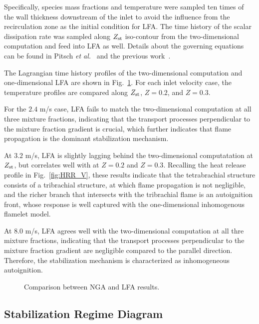 \documentclass{wssci}
\begin{document}
Specifically, species mass fractions and temperature were sampled ten times of the wall thickness downstream of the inlet to avoid the influence from the recirculation zone as the initial condition for LFA.  The time history of the scalar dissipation rate was sampled along $Z_{\rm st}$ iso-contour from the two-dimensional computation and feed into LFA as well.  Details about the governing equations can be found in Pitsch \emph{et al.}~\cite{pitsch98a} and the previous work~\cite{deng15}.

The Lagrangian time history profiles of the two-dimensional computation and one-dimensional LFA are shown in Fig.~\ref{fig:LFA_V}.  For each inlet velocity case, the temperature profiles are compared along $Z_{\rm st}$, $Z = 0.2$, and $Z = 0.3$.  

For the $2.4$ m/s case, LFA fails to match the two-dimensional computation at all three mixture fractions, indicating that the transport processes perpendicular to the mixture fraction gradient is crucial, which further indicates that flame propagation is the dominant stabilization mechanism.

At $3.2$ m/s, LFA is slightly lagging behind the two-dimensional computatation at $Z_{\rm st}$, but correlates well with at $Z = 0.2$ and $Z = 0.3$.  Recalling the heat release profile in Fig.~\ref{fig:HRR_V}, these results indicate that the tetrabrachial structure consists of a tribrachial structure, at which flame propagation is not negligible, and the richer branch that intersects with the tribrachial flame is an autoignition front, whose response is well captured with the one-dimensional inhomogenous flamelet model.  

At $8.0$ m/s, LFA agrees well with the two-dimensional computation at all thre mixture fractions, indicating that the transport processes perpendicular to the mixture fraction gradient are negligible compared to the parallel direction.  Therefore, the stabilization mechanism is characterized as inhomogeneous autoignition.

\begin{figure}
  \centering
  \scriptsize
  
  \normalsize
  \caption{Comparison between NGA and LFA results.}
  \label{fig:LFA_V}
\end{figure}

\subsection{Stabilization Regime Diagram}
\end{document}
